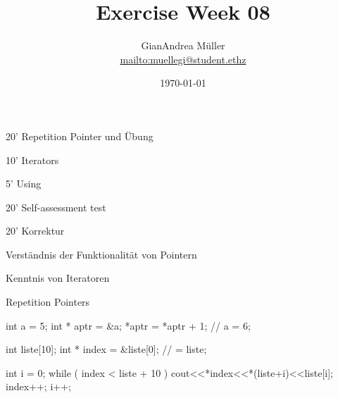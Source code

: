 \ifnum\conditionmacro=1 \documentclass[handout,usenames,dvipsnames]{beamer}\fi
\title{Exercise Week 08}
\author{GianAndrea Müller\\ \url{mailto:muellegi@student.ethz}}
\date{\today}
\begin{document}
\maketitle

\begin{TFTimeSchedule}
\item 20' Repetition Pointer und Übung
\item 10' Iterators
\item 5' Using
\item 20' Self-assessment test
\item 20' Korrektur
\end{TFTimeSchedule}

\begin{TFLearningObjectives}
\item Verständnis der Funktionalität von Pointern
\item Kenntnis von Iteratoren
\end{TFLearningObjectives}

\begin{frame}[fragile]{Repetition Pointers}
\begin{TFCpp}
int a = 5;
int * aptr = &a;
*aptr = *aptr + 1; // a = 6;

int liste[10];
int * index = &liste[0]; // = liste;

int i = 0;
while ( index < liste + 10 ){
	cout<<*index<<*(liste+i)<<liste[i];
	index++; i++;
}
\end{TFCpp}
\end{frame}

\end{document}
